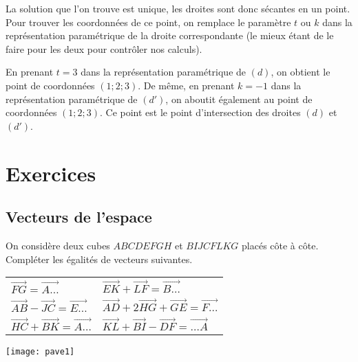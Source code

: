 \documentclass[11pt,fleqn, openany]{book} %
\begin{document}
\begin{example}
La solution que l'on trouve est unique, les droites sont donc sécantes en un point. Pour trouver les coordonnées de ce point, on remplace le paramètre $t$ ou $k$ dans la représentation paramétrique de la droite correspondante (le mieux étant de le faire pour les deux pour contrôler nos calculs).

En prenant $t=3$ dans la représentation paramétrique de $(d)$, on obtient le point de coordonnées $(1;2;3)$. De même, en prenant $k=-1$ dans la représentation paramétrique de $(d')$, on aboutit également au point de coordonnées $(1;2;3)$. Ce point est le point d'intersection des droites $(d)$ et $(d')$.
\end{example}

\chapter{Exercices}


\section*{Vecteurs de l'espace}


\begin{exercise}\hspace{0pt}

\begin{minipage}{0.5 \linewidth}On considère deux cubes $ABCDEFGH$ et $BIJCFLKG$ placés côte à côte. Compléter les égalités de vecteurs suivantes.
\vskip10pt
\begin{tabularx}{\linewidth}{XX}
 $\overrightarrow{FG} = \overrightarrow{A\ldots}$ & $\overrightarrow{EK}+\overrightarrow{LF}= \overrightarrow{B\ldots}$ \\
 $\overrightarrow{AB}- \overrightarrow{JC} = \overrightarrow{E\ldots}$ &  $\overrightarrow{AD}+2\overrightarrow{HG}+\overrightarrow{GE}=\overrightarrow{F\ldots}$ \\
 $\overrightarrow{HC}+\overrightarrow{BK} = \overrightarrow{A\ldots}$ & $\overrightarrow{KL} + \overrightarrow{BI} - \overrightarrow{DF} = \overrightarrow{\ldots A}$
\end{tabularx}


\end{minipage}\hfill \begin{minipage}{0.4\linewidth}
\texttt{[image: pave1]}

\end{minipage}
\vspace{-0.5cm}\end{exercise}
\end{document}

